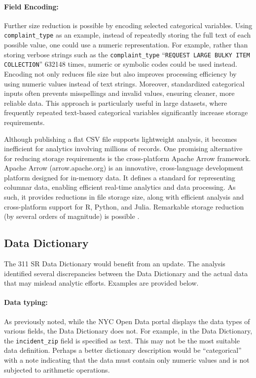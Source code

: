 \documentclass[linenumber]{jdsart}
\begin{document}
\paragraph{Field Encoding:} Further size reduction is possible 
by encoding selected categorical variables. Using 
\texttt{complaint\_type} as an example,
instead of repeatedly storing the full text of each possible value,
one could use a numeric representation. For example, rather than
storing verbose strings such as the \texttt{complaint\_type} 
“\texttt{REQUEST LARGE BULKY ITEM COLLECTION}” \num{632148} times,
numeric or symbolic codes could be used instead. Encoding not only 
reduces file size but also improves processing efficiency by 
using numeric values instead of text strings. Moreover, standardized 
categorical inputs often prevents misspellings and invalid values, ensuring 
cleaner, more reliable data. This approach is particularly useful in 
large datasets, where frequently repeated text-based 
categorical variables significantly increase storage requirements.

Although publishing a flat CSV file supports lightweight 
analysis, it becomes inefficient for analytics 
involving millions of records. One promising alternative for reducing 
storage requirements is the cross-platform Apache Arrow framework. 
Apache Arrow (arrow.apache.org) is an innovative, cross-language 
development platform designed for in-memory data. 
It defines a standard for representing columnar data, 
enabling efficient real-time analytics and data processing. As such, 
it provides reductions in file storage size,
along with efficient analysis and cross-platform support for R,
Python, and Julia.
 Remarkable storage 
reduction (by several orders of magnitude) 
is possible \citep{bates2024csv}.

\subsection{Data Dictionary} 
\label{sec:datadictionary}


The 311 SR Data Dictionary would benefit from an update. The analysis 
identified several discrepancies between the Data Dictionary and 
the actual data that may mislead analytic efforts. Examples are provided below.


\paragraph{Data typing:} As previously noted, while the NYC Open Data 
portal displays the data types of various fields, the 
Data Dictionary does not. For example, in the Data Dictionary, 
the \texttt{incident\_zip} field is specified as text. This may 
not be the most suitable data definition. Perhaps a better 
dictionary description would be ``categorical'' with a note 
indicating that the data must contain only numeric values 
and is not subjected to arithmetic operations.
\end{document}
